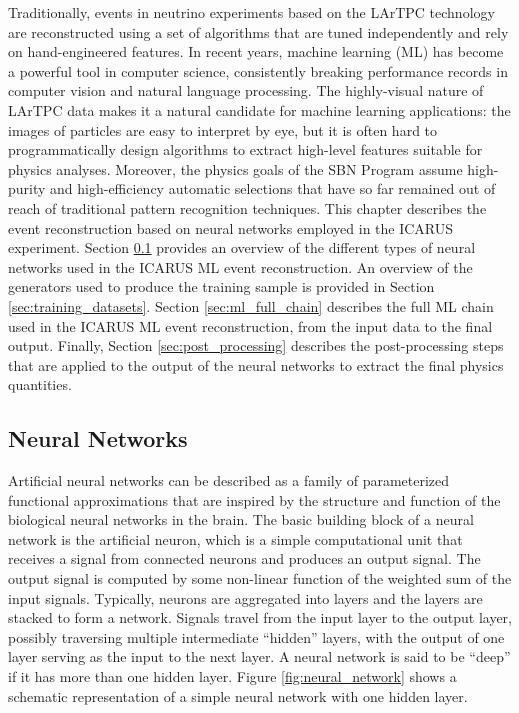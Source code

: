 Traditionally, events in neutrino experiments based on the LArTPC technology are reconstructed using a set of algorithms that are tuned independently and rely on hand-engineered features. In recent years, machine learning (ML) has become a powerful tool in computer science, consistently breaking performance records in computer vision and natural language processing. The highly-visual nature of LArTPC data makes it a natural candidate for machine learning applications: the images of particles are easy to interpret by eye, but it is often hard to programmatically design algorithms to extract high-level features suitable for physics analyses. Moreover, the physics goals of the SBN Program assume high-purity and high-efficiency automatic selections that have so far remained out of reach of traditional pattern recognition techniques. This chapter describes the event reconstruction based on neural networks employed in the ICARUS experiment. Section \ref{sec:neural_networks} provides an overview of the different types of neural networks used in the ICARUS ML event reconstruction. An overview of the generators used to produce the training sample is provided in Section \ref{sec:training_datasets}. Section \ref{sec:ml_full_chain} describes the full ML chain used in the ICARUS ML event reconstruction, from the input data to the final output. Finally, Section \ref{sec:post_processing} describes the post-processing steps that are applied to the output of the neural networks to extract the final physics quantities.

\subsection{Neural Networks}
\label{sec:neural_networks}

Artificial neural networks can be described as a family of parameterized functional approximations that are inspired by the structure and function of the biological neural networks in the brain. The basic building block of a neural network is the artificial neuron, which is a simple computational unit that receives a signal from connected neurons and produces an output signal. The output signal is computed by some non-linear function of the weighted sum of the input signals. Typically, neurons are aggregated into layers and the layers are stacked to form a network. Signals travel from the input layer to the output layer, possibly traversing multiple intermediate ``hidden'' layers, with the output of one layer serving as the input to the next layer. A neural network is said to be ``deep'' if it has more than one hidden layer. Figure \ref{fig:neural_network} shows a schematic representation of a simple neural network with one hidden layer.

